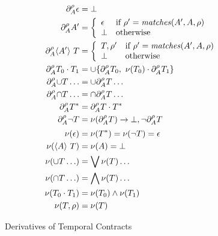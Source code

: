 \begin{figure}
  \begin{align*}
    \derivee{\mevent}{\epsilon}{\menv} &= \bot
\\
    \derivee{\mevent}{\mevent'}{\menv} &= \left\{
      \begin{array}{ll}
        \epsilon & \text{if } \menv' = \matches(\mevent', \mevent, \menv) \\
        \bot & \text{otherwise}
      \end{array}\right.
\\
    \derivee{\mevent}{\stbind{\mevent'}{\mtcon}}{\menv} &=
    \left\{\begin{array}{ll}
      \mtcon,\menv' & \text{if } \menv' = \matches(\mevent', \mevent, \menv) \\
      \bot & \text{otherwise}
    \end{array}\right.
\\
    \derivee{\mevent}{\stseq{\mtcon_0}{\mtcon_1}}{\menv} &= \stOr{\setof{\derivee{\mevent}{\mtcon_0}{\menv},\ \stseq{\nullable(\mtcon_0)}{\derivee{\mevent}{\mtcon_1}{\menv}}}}
\\
    \derivee{\mevent}{\stOr{\mtcon\ldots}}{\menv} &= \stOr{\derivee{\mevent}{\mtcon}{\menv}\ldots}
\\
    \derivee{\mevent}{\stAnd{\mtcon\ldots}}{\menv} &= \stAnd{\derivee{\mevent}{\mtcon}{\menv}\ldots}
\\
    \derivee{\mevent}{\stmany{\mtcon}}{\menv} &= \stseq{\derivee{\mevent}{\mtcon}{\menv}}{\stmany{\mtcon}}
\\
    \derivee{\mevent}{\stnot{\mtcon}}{\menv} &= \nullable(\derivee{\mevent}{\mtcon}{\menv}) \to \bot, \stnot{\derivee{\mevent}{\mtcon}{\menv}}
\\[2pt]
    \nullable(\epsilon) &= \nullable(\stmany{\mtcon}) = \nullable(\stnot{\mtcon}) = \epsilon
\\
    \nullable(\stbind{\mevent}{\mtcon}) &= \nullable(\mevent) = \bot
\\
    \nullable(\stOr{\mtcon\ldots}) &= \bigvee{\nullable(\mtcon)\ldots}
\\
    \nullable(\stAnd{\mtcon\ldots}) &= \bigwedge{\nullable(\mtcon)\ldots}
\\
    \nullable(\stseq{\mtcon_0}{\mtcon_1}) &= \nullable(\mtcon_0)\wedge \nullable(\mtcon_1)
\\
    \nullable(\mtcon,\menv) &= \nullable(\mtcon)
  \end{align*}
  \caption{Derivatives of Temporal Contracts}
  \label{fig:tcon-deriv}
\end{figure}

